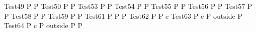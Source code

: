 \documentclass{article}
\begin{document}
\begin{circus}
   \circprocess Test49 \circdef P  P
   \also
   \circprocess Test50 \circdef P  P
   \also
   \circprocess Test53 \circdef P  P
   \also
   \circprocess Test54 \circdef P  P
   \also
   \circprocess Test55 \circdef P  P
   \also
   \circprocess Test56 \circdef P  P
   \also
   \circprocess Test57 \circdef P  P
   \also
   \circprocess Test58 \circdef P  P
   \also
   \circprocess Test59 \circdef P  P
   \also
   \circprocess Test61 \circdef  P \circseq P  P
   \also
   \circprocess Test62 \circdef P   P  
   \circhide \lchanset c \rchanset
   \also
   \circprocess Test63 \circdef  P \lpar \lchanset c \rchanset \rpar P \circtimedinterrupt  
   {\lcirctime outside \rcirctime} P
   \also
   \circprocess Test64 \circdef  P \lpar \lchanset c \rchanset \rpar P \circtimedinterrupt  
   {\lcirctime outside \rcirctime} P  P 
\end{circus}
\end{document}
